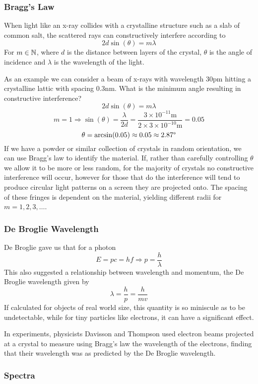 \documentclass[12pt]{report}
\begin{document}
\begin{flushleft}
\subsubsection*{Bragg's Law}

When light like an x-ray collides with a crystalline structure such as a slab
of common salt, the scattered rays can constructively interfere according to 
\[2d\sin(\theta) = m\lambda\]
For \(m \in \mathbb{N}\), where \(d\) is the distance between layers of the crystal,
\(\theta\) is the angle of incidence and \(\lambda\) is the wavelength of the
light. \par
As an example we can consider a beam of x-rays with wavelength
\(30\mathrm{pm}\) hitting a crystalline lattic with spacing \(0.3\mathrm{nm}\).
What is the minimum angle resulting in constructive interference?
\[2d\sin(\theta) = m\lambda\]
\[m = 1 \Rightarrow \sin(\theta) = \frac{\lambda}{2d}
= \frac{3\times10^{-11}\mathrm{m}}{2\times3\times10^{-10}\mathrm{m}} = 0.05\]
\[\theta = \arcsin(0.05) \approx 0.05 \approx 2.87\degree\]
If we have a powder or similar collection of crystals in random orientation,
we can use Bragg's law to identify the material. If, rather than carefully
controlling \(\theta\) we allow it to be more or less random, for the majority
of crystals no constructive interference will occur, however for those that do
the interference will tend to produce circular light patterns on a screen they
are projected onto. The spacing of these fringes is dependent on the material,
yielding different radii for \(m = 1, 2, 3, \ldots\).

\subsubsection*{De Broglie Wavelength}

De Broglie gave us that for a photon
\[E = pc = hf \Rightarrow p = \frac{h}{\lambda}\]
This also suggested a relationship between wavelength and momentum, the De
Broglie wavelength given by
\[\lambda = \frac{h}{p} = \frac{h}{mv}\]
If calculated for objects of real world size, this quantity is so miniscule as
to be undetectable, while for tiny particles like electrons, it can have a
significant effect. \par
In experiments, physicists Davisson and Thompson used electron beams projected
at a crystal to measure using Bragg's law the wavelength of the electrons,
finding that their wavelength was as predicted by the De Broglie wavelength.

\subsubsection*{Spectra}


\end{flushleft}
\end{document}
